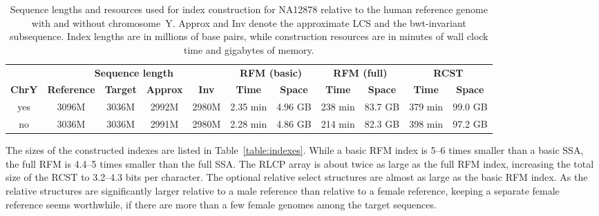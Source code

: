 \documentclass[a4paper,11pt]{llncs}
\newcommand{\RCST}{\textsf{RCST}}
\newcommand{\SSA}{\textsf{SSA}}
\newcommand{\RFM}{\textsf{RFM}}
\newcommand{\RLCP}{\textsf{RLCP}}
\newcommand{\LCS}{\textsf{LCS}}
\begin{document}
\begin{table}
\caption{Sequence lengths and resources used for index construction for NA12878 relative to the human reference genome with and without chromosome~Y. Approx and Inv denote the approximate \LCS{} and the bwt-invariant subsequence. Index lengths are in millions of base pairs, while construction resources are in minutes of wall clock time and gigabytes of memory.}\label{table:construction}
\setlength{\extrarowheight}{2pt}
\setlength{\tabcolsep}{3pt}
\begin{center}
\begin{tabular}{c|cccc|cc|cc|cc}
\hline
 &
\multicolumn{4}{c|}{\textbf{Sequence length}} &
\multicolumn{2}{c|}{\textbf{\RFM{} (basic)}} &
\multicolumn{2}{c|}{\textbf{\RFM{} (full)}} &
\multicolumn{2}{c}{\textbf{\RCST}} \\
\textbf{ChrY} &
\textbf{Reference} & \textbf{Target} & \textbf{Approx} & \textbf{Inv} &
\textbf{Time} & \textbf{Space} &
\textbf{Time} & \textbf{Space} &
\textbf{Time} & \textbf{Space} \\
\hline
yes & 3096M & 3036M & 2992M & 2980M & 2.35 min & 4.96 GB & 238 min & 83.7 GB & 379 min & 99.0 GB \\
no  & 3036M & 3036M & 2991M & 2980M & 2.28 min & 4.86 GB & 214 min & 82.3 GB & 398 min & 97.2 GB \\
\hline
\end{tabular}
\end{center}
\end{table}

The sizes of the constructed indexes are listed in Table~\ref{table:indexes}. While a basic \RFM{} index is 5--6 times smaller than a basic \SSA, the full \RFM{} is 4.4--5 times smaller than the full \SSA. The \RLCP{} array is about twice as large as the full \RFM{} index, increasing the total size of the \RCST{} to 3.2--4.3 bits per character. The optional relative select structures are almost as large as the basic \RFM{} index. As the relative structures are significantly larger relative to a male reference than relative to a female reference, keeping a separate female reference seems worthwhile, if there are more than a few female genomes among the target sequences.
\end{document}
